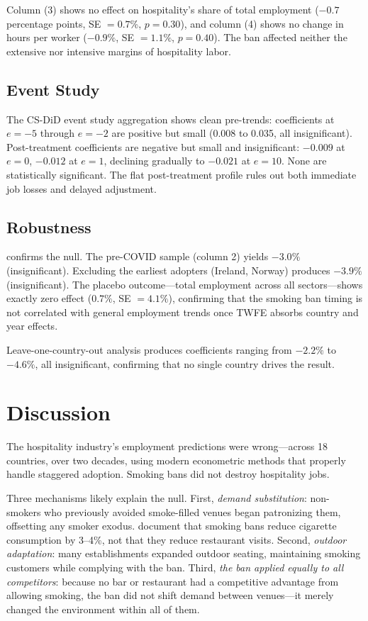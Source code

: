 \documentclass[12pt]{article}
\begin{document}
Column (3) shows no effect on hospitality's share of total employment ($-0.7$ percentage points, SE $= 0.7$\%, $p = 0.30$), and column (4) shows no change in hours per worker ($-0.9\%$, SE $= 1.1\%$, $p = 0.40$). The ban affected neither the extensive nor intensive margins of hospitality labor.

\subsection{Event Study}

The CS-DiD event study aggregation shows clean pre-trends: coefficients at $e = -5$ through $e = -2$ are positive but small (0.008 to 0.035, all insignificant). Post-treatment coefficients are negative but small and insignificant: $-0.009$ at $e = 0$, $-0.012$ at $e = 1$, declining gradually to $-0.021$ at $e = 10$. None are statistically significant. The flat post-treatment profile rules out both immediate job losses and delayed adjustment.

\subsection{Robustness}



 confirms the null. The pre-COVID sample (column 2) yields $-3.0\%$ (insignificant). Excluding the earliest adopters (Ireland, Norway) produces $-3.9\%$ (insignificant). The placebo outcome---total employment across all sectors---shows exactly zero effect ($0.7\%$, SE $= 4.1\%$), confirming that the smoking ban timing is not correlated with general employment trends once TWFE absorbs country and year effects.

Leave-one-country-out analysis produces coefficients ranging from $-2.2\%$ to $-4.6\%$, all insignificant, confirming that no single country drives the result.


\section{Discussion}

The hospitality industry's employment predictions were wrong---across 18 countries, over two decades, using modern econometric methods that properly handle staggered adoption. Smoking bans did not destroy hospitality jobs.

Three mechanisms likely explain the null. First, \textit{demand substitution}: non-smokers who previously avoided smoke-filled venues began patronizing them, offsetting any smoker exodus. \citet{fichtenberg2000} document that smoking bans reduce cigarette consumption by 3--4\%, not that they reduce restaurant visits. Second, \textit{outdoor adaptation}: many establishments expanded outdoor seating, maintaining smoking customers while complying with the ban. Third, \textit{the ban applied equally to all competitors}: because no bar or restaurant had a competitive advantage from allowing smoking, the ban did not shift demand between venues---it merely changed the environment within all of them.
\end{document}
